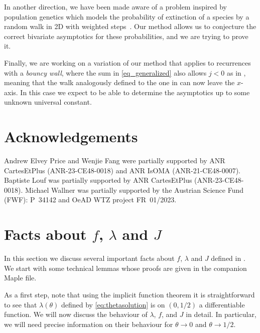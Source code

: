\documentclass[a4paper,12pt]{article}
\theoremstyle{definition}
\begin{document}
In another direction, we have been made aware of a problem inspired by population genetics which models the probability of extinction of a species by a random walk in 2D with weighted steps~\cite{flower}. Our method allows us to conjecture the correct bivariate asymptotics for these probabilities, and we are trying to prove it.

Finally, we are working on a variation of our method that applies to recurrences with a \emph{bouncy wall}, where the sum in \eqref{eq_generalized} also allows $j<0$ as in \cite{compacted-tree}, meaning that the walk analogously defined to the one in  can now leave the $x$-axis.
In this case we expect to be able to determine the asymptotics up to some unknown universal constant.


\section*{Acknowledgements} 


Andrew Elvey Price and Wenjie Fang were partially supported by ANR CartesEtPlus (ANR-23-CE48-0018) and ANR IsOMA (ANR-21-CE48-0007).
Baptiste Louf was partially supported by ANR CartesEtPlus (ANR-23-CE48-0018).
Michael Wallner was partially supported by the Austrian Science Fund (FWF): P~34142 and OeAD WTZ project FR~01/2023.


\printbibliography

\clearpage


\appendix

\section{Facts about $f$, $\lambda$ and $J$}\label{sec:facts_f_and_co}

In this section we discuss several important facts about $f$, $\lambda$ and $J$ defined in .
We start with some technical lemmas whose proofs are given in the companion Maple file.

As a first step, note that using the implicit function theorem it is straightforward to see that $\lambda(\theta)$ defined by \eqref{eq:thetasolution} is on $(0,1/2)$ a differentiable function. 
We will now discuss the behaviour of $\lambda$, $f$, and $J$ in detail. 
In particular, we will need precise information on their behaviour for $\theta \to 0$ and $\theta \to 1/2$.
\end{document}
